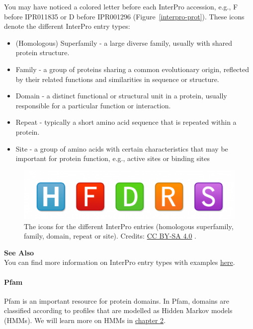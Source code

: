 You may have noticed a colored letter before each InterPro accession, e.g., F before IPR011835 or D before IPR001296 (Figure~\ref{interpro-prot}).
These icons denote the different InterPro entry types:

\begin{itemize}
\item (Homologous) Superfamily - a large diverse family, usually with shared protein structure.
\item Family - a group of proteins sharing a common evolutionary origin, reflected by their related functions and similarities in sequence or structure.
\item Domain - a distinct functional or structural unit in a protein, usually responsible for a particular function or interaction.
\item Repeat - typically a short amino acid sequence that is repeated within a protein.
\item Site - a group of amino acids with certain characteristics that may be important for protein function, e.g., active sites or binding sites
\end{itemize}

\begin{figure}[!htbp]
\centering
\includegraphics[width=0.4\linewidth]{files/interpro-types-5f7c10e9e25c86c696214d3eeac1e545.png}
\caption[]{The icons for the different InterPro entries (homologous superfamily, family, domain, repeat or site).
Credits: \href{https://creativecommons.org/licenses/by-sa/4.0/}{CC BY-SA 4.0} \cite{interpro-types_2020}.}
\label{interpro-types}
\end{figure}

\begin{framed}
\textbf{See Also}\\
You can find more information on InterPro entry types with examples \href{https://www.ebi.ac.uk/training/online/courses/interpro-functional-and-structural-analysis/what-is-an-interpro-entry/interpro-entry-types/}{here}.
\end{framed}

\paragraph{Pfam}\label{chapter1_pfam}

Pfam is an important resource for protein domains.
In Pfam, domains are classified according to profiles that are modelled as Hidden Markov models (HMMs).
We will learn more on HMMs in \href{/chapter2}{chapter 2}.

